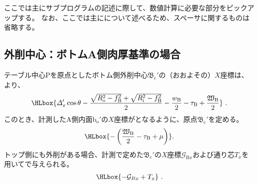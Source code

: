 

ここでは主にサブプログラムの記述に際して、数値計算に必要な部分をピックアップする。
なお、ここでは主に\DMname について述べるため、スペーサに関するものは省略する。





\subsection{外削中心：ボトムA側肉厚基準の場合}
テーブル中心Pを原点としたボトム側外削中心$\mathfrak B_\mathrm c'$の（おおよその）$X$座標は、より、
\begin{align*}
  \HLbox{%
    \varDelta_x'\cos\theta
    -\frac{\sqrt{R_\mathrm o^2-f_\mathrm B^2}+\sqrt{R_\mathrm i^2-f_\mathrm B^2}}2
    -\frac{w_\mathrm B}2
    -\tau_\mathrm B
    +\frac{\mathfrak W_\mathrm B}2
  }\ .
\end{align*}
このとき、計測したA側内面b$_\mathrm o'$の$X$座標がとなるように、原点$\mathfrak B_\mathrm c'$を定める。
\begin{align*}
  \HLbox{-\left(\frac{\mathfrak W_\mathrm B}2-\tau_\mathrm B+\mu\right)}.
\end{align*}
トップ側にも外削がある場合、計測で定めた$\mathfrak B_\mathrm c'$の$X$座標$\mathcal G_{\mathrm Bx}$および通り芯$T_x$を用いてで与えられる。
\begin{align*}
  \HLbox{-\mathcal G_{Bx}+T_x}\ .
\end{align*}


